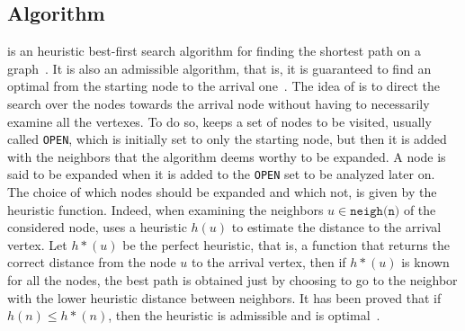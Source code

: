 \subsection{\astar Algorithm}
\astar is an heuristic best-first search algorithm for finding the shortest
path on a graph~\cite{MAPF_overview}. It is also an admissible algorithm, that
is, it is guaranteed to find an optimal from the starting node to the arrival
one~\cite{astar}. \newline
The idea of \astar is to direct the search over the nodes towards the arrival
node without having to necessarily examine all the vertexes. To do so, \astar
keeps a set of nodes to be visited, usually called \texttt{OPEN}, which is
initially set to only the starting node, but then it is added with the
neighbors that the algorithm deems worthy to be expanded. A node is said to be
expanded when it is added to the \texttt{OPEN} set to be analyzed later on.
\newline
The choice of which nodes should be expanded and which not, is given by the
heuristic function. Indeed, when examining the neighbors 
$u\in \texttt{neigh(n)}$ of the considered node, \astar uses a heuristic $h(u)$ 
to estimate the distance to the arrival vertex. Let $h*(u)$ be the perfect
heuristic, that is, a function that returns the correct distance from the node
$u$ to the arrival vertex, then if $h*(u)$ is known for all the nodes, the best
path is obtained just by choosing to go to the neighbor with the lower
heuristic distance between neighbors. It has been proved that if $h(n)\leq
h*(n)$, then the heuristic is admissible and \astar is optimal~\cite{astar}.



